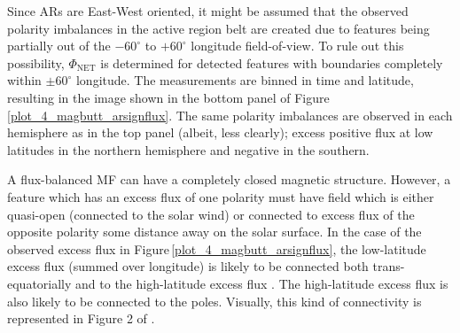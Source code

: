 \documentclass[namedreferences]{solarphysics}
\begin{document}
\begin{article}
Since ARs are East-West oriented, it might be assumed that the observed polarity imbalances in the active region belt are created due to features being partially out of the $-60^{\circ}$ to $+60^{\circ}$ longitude field-of-view. To rule out this possibility, $\Phi_{\mathrm{NET}}$ is determined for detected features with boundaries completely within $\pm60^{\circ}$ longitude. The measurements are binned in time and latitude, resulting in the image shown in the bottom panel of Figure\,\ref{plot_4_magbutt_arsignflux}. The same polarity imbalances are observed in each hemisphere as in the top panel (albeit, less clearly); excess positive flux at low latitudes in the northern hemisphere and negative in the southern.

A flux-balanced MF can have a completely closed magnetic structure. However, a feature which has an excess flux of one polarity must have field which is either quasi-open (connected to the solar wind) or connected to excess flux of the opposite polarity some distance away on the solar surface. In the case of the observed excess flux in Figure\,\ref{plot_4_magbutt_arsignflux}, the low-latitude excess flux (summed over longitude) is likely to be connected both trans-equatorially and to the high-latitude excess flux \citep{Choudhary:2002}. The high-latitude excess flux is also likely to be connected to the poles. Visually, this kind of connectivity is represented in Figure 2 of \citet{Bravo:1998}.



\end{article}
\end{document}
